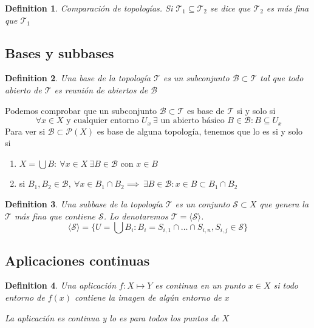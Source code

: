 \documentclass[leqno]{article}
\newtheorem*{definition}{Definition}
\begin{document}
\begin{definition}
Comparación de topologías. Si $\mathcal{T}_1\subseteq \mathcal{T}_2$ se dice que $\mathcal{T}_2$ es más fina que $\mathcal{T}_1$
\end{definition}

\subsection{Bases y subbases}
\begin{definition}
Una base de la topología $\mathcal{T}$ es un subconjunto $\mathcal{B}\subset \mathcal{T}$ tal que todo abierto de $\mathcal{T}$ es reunión de abiertos de $\mathcal{B}$ 
\end{definition}
Podemos comprobar que un subconjunto $\mathcal{B}\subset \mathcal{T}$ es base de $\mathcal{T}$ si y solo si
 \[
\ \forall x \in X \text{ y cualquier entorno } U_x \ \exists \text{ un abierto básico } B\in \mathcal{B}: B\subseteq U_x
\] 
Para ver si $\mathcal{B}\subset \mathcal{P}(X)$ es base de alguna topología, tenemos que lo es si y solo si
\begin{enumerate}[topsep=-6pt, itemsep=0pt]
  \item $X=\bigcup B: \ \forall x \in X \ \exists B \in \mathcal{B}$ con $x \in B$ 
  \item si $B_1, B_2 \in \mathcal{B}, \ \forall x \in B_1 \cap B_2 \implies \ \exists B\in \mathcal{B}: x\in B\subset B_1\cap B_2$
\end{enumerate}

\begin{definition}
Una subbase de la topología $\mathcal{T}$ es un conjunto $\mathcal{S}\subset X$ que genera la $\mathcal{T}$ más fina que contiene $\mathcal{S}$. Lo denotaremos $\mathcal{T} = \langle \mathcal{S} \rangle $.
\[
\langle \mathcal{S} \rangle  = \{U=\bigcup B_i: B_i  = S_{i, 1}\cap \ldots \cap S_{i, n}, S_{i, j}\in  \mathcal{S}\}
\] 
\end{definition}

\subsection{Aplicaciones continuas}
\begin{definition}
Una aplicación $f : X\mapsto Y$ es continua en un punto $x\in X$ si todo entorno de $f(x)$ contiene la imagen de algún entorno de  $x$

La aplicación es continua y lo es para todos los puntos de  $X$
\end{definition}
\end{document}
